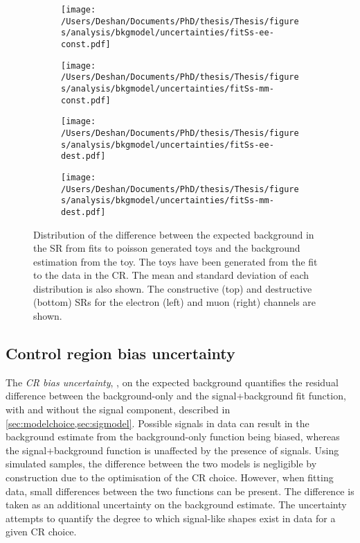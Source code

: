 \begin{figure}[h!]
    \centering
    \begin{subfigure}[b]{0.49\textwidth}
        \centering
        \texttt{[image: /Users/Deshan/Documents/PhD/thesis/Thesis/figures/analysis/bkgmodel/uncertainties/fitSs-ee-const.pdf]}
        \label{fig:bkgmodel:toyss1}
    \end{subfigure}
    \begin{subfigure}[b]{0.49\textwidth}
        \centering
        \texttt{[image: /Users/Deshan/Documents/PhD/thesis/Thesis/figures/analysis/bkgmodel/uncertainties/fitSs-mm-const.pdf]}
        \label{fig:bkgmodel:toyss2}
    \end{subfigure}
    \begin{subfigure}[b]{0.49\textwidth}
        \centering
        \texttt{[image: /Users/Deshan/Documents/PhD/thesis/Thesis/figures/analysis/bkgmodel/uncertainties/fitSs-ee-dest.pdf]}
        \label{fig:bkgmodel:toyss3}
    \end{subfigure}
    \begin{subfigure}[b]{0.49\textwidth}
        \centering
        \texttt{[image: /Users/Deshan/Documents/PhD/thesis/Thesis/figures/analysis/bkgmodel/uncertainties/fitSs-mm-dest.pdf]}
        \label{fig:bkgmodel:toyss4}
    \end{subfigure}
    \caption[Distributions of extrapolation from fit to poisson distributed toys generated in the CR]{Distribution of the difference between the expected background in the SR from fits to poisson generated toys and the background estimation from the toy. The toys have been generated from the fit to the data in the CR. The mean and standard deviation of each distribution is also shown. The constructive (top) and destructive (bottom) SRs for the electron (left) and muon (right) channels are shown.}
    \label{fig:bkgmodel:toyss}
\end{figure}

\subsection{Control region bias uncertainty}\label{sec:uncertBkgmodel:crbu}
The \emph{CR bias uncertainty}, \CRBU, on the expected background quantifies the residual difference between the background-only and the signal+background fit function, with and without the signal component, described in \cref{sec:modelchoice,sec:sigmodel}. Possible signals in data can result in the background estimate from the background-only function being biased, whereas the signal+background function is unaffected by the presence of signals. Using simulated samples, the difference between the two models is negligible by construction due to the optimisation of the CR choice. However, when fitting data, small differences between the two functions can be present. The difference is taken as an additional uncertainty on the background estimate. The uncertainty attempts to quantify the degree to which signal-like shapes exist in data for a given CR choice. 

